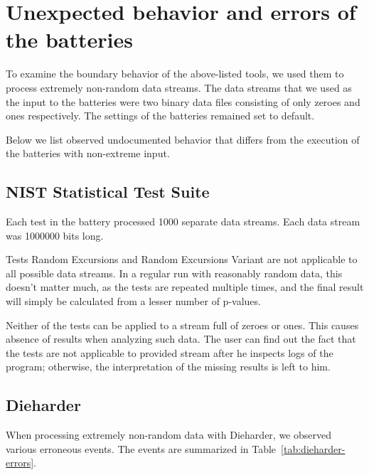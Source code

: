 \documentclass[
  digital,  	%
  color,		%
  oneside,   	%
  12pt,
  nocover,
  notable,
  nolof,
  nolot,
]{fithesis3}
\begin{document}
\section{Unexpected behavior and errors of the batteries}
To examine the boundary behavior of the above-listed tools, we used them to process extremely non-random data streams. The data streams that we used as the input to the batteries were two binary data files consisting of only zeroes and ones respectively. The settings of the batteries remained set to default. 

Below we list observed undocumented behavior that differs from the execution of the batteries with non-extreme input.

\subsection*{NIST Statistical Test Suite}
Each test in the battery processed 1000 separate data streams. Each data stream was 1000000 bits long.

Tests Random Excursions and Random Excursions Variant are not applicable to all possible data streams. In a regular run with reasonably random data, this doesn't matter much, as the tests are repeated multiple times, and the final result will simply be calculated from a lesser number of p-values. 

Neither of the tests can be applied to a stream full of zeroes or ones. This causes absence of results when analyzing such data. The user can find out the fact that the tests are not applicable to provided stream after he inspects logs of the program; otherwise, the interpretation of the missing results is left to him.

\subsection*{Dieharder}
When processing extremely non-random data with Dieharder, we observed various erroneous events. The events are summarized in Table~\ref{tab:dieharder-errors}. 
\end{document}
